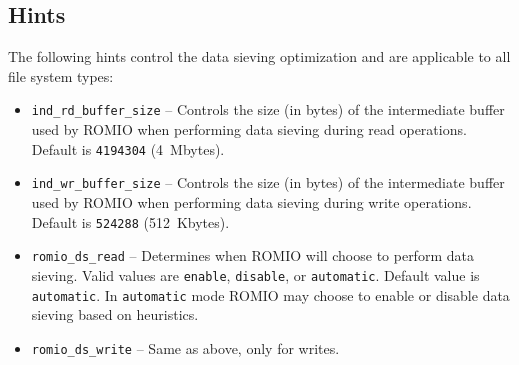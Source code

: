 \subsection{Hints}
\label{sec:hints}

The following hints control the data sieving optimization and are
applicable to all file system types:
\begin{itemize}
\item \texttt{ind\_rd\_buffer\_size} -- Controls the size (in bytes) of the
intermediate buffer used by ROMIO when performing data sieving during
read operations.  Default is \texttt{4194304} (4~Mbytes).
\item \texttt{ind\_wr\_buffer\_size} -- Controls the size (in bytes) of the
intermediate buffer used by ROMIO when performing data sieving during
write operations.  Default is \texttt{524288} (512~Kbytes).
\item \texttt{romio\_ds\_read} -- 
Determines when ROMIO will choose to perform data sieving.
Valid values are \texttt{enable}, \texttt{disable}, or \texttt{automatic}.
Default value is \texttt{automatic}.  In \texttt{automatic} mode ROMIO
may choose to enable or disable data sieving based on heuristics.
\item \texttt{romio\_ds\_write} -- Same as above, only for writes.
\end{itemize}

